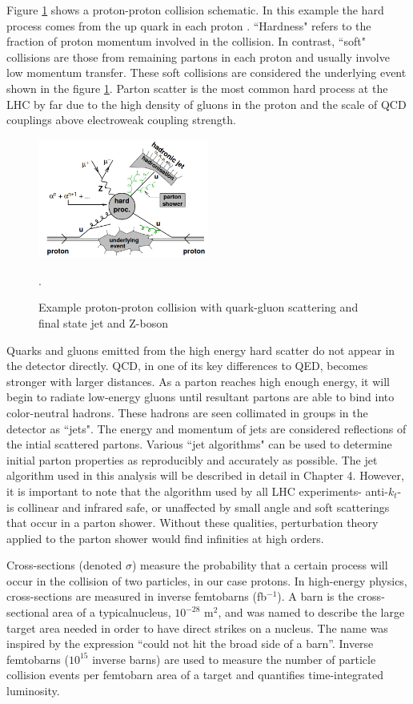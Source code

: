 Figure \ref{fig:protonproton} shows a proton-proton collision schematic. In this example the hard process comes from the up quark in each proton \cite{Butterworth}. ``Hardness" refers to the fraction of proton momentum involved in the collision. In contrast, ``soft" collisions are those from remaining partons in each proton and usually involve low momentum transfer. These soft collisions are considered the underlying event shown in the figure \ref{fig:protonproton}. Parton scatter is the most common hard process at the LHC by far due to the high density of gluons in the proton and the scale of QCD couplings above electroweak coupling strength. 
\begin{figure}[H]
        \centering
    \includegraphics[width=0.5\textwidth] {Pictures/protonproton.png}\hspace{1cm}
    \caption{Example proton-proton collision with quark-gluon scattering and final state jet and Z-boson \cite{Butterworth}}.
    \label{fig:protonproton}
\end{figure}
Quarks and gluons emitted from the high energy hard scatter do not appear in the detector directly. QCD, in one of its key differences to QED, becomes stronger with larger distances. As a parton reaches high enough energy, it will begin to radiate low-energy gluons until resultant partons are able to bind into color-neutral hadrons. These hadrons are seen collimated in groups in the detector as ``jets". The energy and momentum of jets are considered reflections of the intial scattered partons. Various ``jet algorithms" can be used to determine initial parton properties as reproducibly and accurately as possible. The jet algorithm used in this analysis will be described in detail in Chapter 4. However, it is important to note that the algorithm used by all LHC experiments- anti-$k_t$- is collinear and infrared safe, or unaffected by small angle and soft scatterings that occur in a parton shower. Without these qualities, perturbation theory applied to the parton shower would find infinities at high orders.

Cross-sections (denoted $\sigma$) measure the probability that a certain process will occur in the collision of two particles, in our case protons. In high-energy physics, cross-sections are measured in inverse femtobarns (fb$^{-1}$). A barn is the cross-sectional area of a typicalnucleus, $10^{-28}$ m$^2$, and was named to describe the large target area needed in order to have direct strikes on a nucleus. The name was inspired by the expression ``could not hit the broad side of a barn''. Inverse femtobarns ($10^{15}$ inverse barns) are used to measure the number of particle collision events per femtobarn area of a target and quantifies time-integrated luminosity. 

